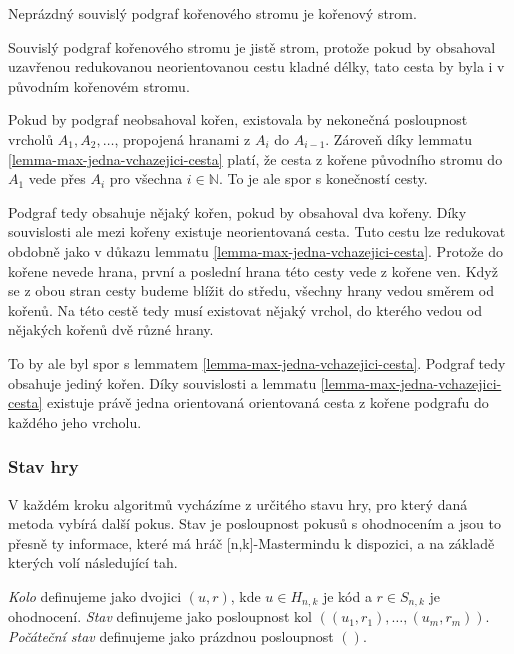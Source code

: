\begin{tvrz}
    Neprázdný souvislý podgraf kořenového stromu je kořenový strom.
\end{tvrz}
\begin{dukaz}
    Souvislý podgraf kořenového stromu je jistě strom, protože pokud by obsahoval uzavřenou redukovanou neorientovanou cestu kladné délky, tato cesta by byla i v původním kořenovém stromu. 

    Pokud by podgraf neobsahoval kořen, existovala by nekonečná posloupnost vrcholů $A_1, A_2, \dots$, propojená hranami z $A_i$ do $A_{i-1}$. Zároveň díky lemmatu \ref{lemma-max-jedna-vchazejici-cesta} platí, že cesta z kořene původního stromu do $A_1$ vede přes $A_i$ pro všechna $i \in \mathbb{N}$. To je ale spor s konečností cesty. 

    Podgraf tedy obsahuje nějaký kořen, pokud by obsahoval dva kořeny. Díky souvislosti ale mezi kořeny existuje neorientovaná cesta. Tuto cestu lze redukovat obdobně jako v důkazu lemmatu \ref{lemma-max-jedna-vchazejici-cesta}. Protože do kořene nevede hrana, první a poslední hrana této cesty vede z kořene ven. Když se z obou stran cesty budeme blížit do středu, všechny hrany vedou směrem od kořenů. Na této cestě tedy musí existovat nějaký vrchol, do kterého vedou od nějakých kořenů dvě různé hrany. 
    
    To by ale byl spor s lemmatem \ref{lemma-max-jedna-vchazejici-cesta}. Podgraf tedy obsahuje jediný kořen. Díky souvislosti a lemmatu \ref{lemma-max-jedna-vchazejici-cesta} existuje právě jedna orientovaná orientovaná cesta z kořene podgrafu do každého jeho vrcholu. 
\end{dukaz}


\subsubsection{Stav hry}
V každém kroku algoritmů vycházíme z určitého stavu hry, pro který daná metoda vybírá další pokus. Stav je posloupnost pokusů s ohodnocením a jsou to přesně ty informace, které má hráč [n,k]-Mastermindu k dispozici, a na základě kterých volí následující tah.

\begin{definice}\label{stav}
   \emph{Kolo} definujeme jako dvojici $(u,r)$, kde $u \in H_{n,k}$ je kód a $r \in S_{n,k}$ je ohodnocení. 
   \emph{Stav} definujeme jako posloupnost kol $((u_1, r_1), \dots, (u_m, r_m))$. \emph{Počáteční stav} definujeme jako prázdnou posloupnost $()$.
\end{definice}

